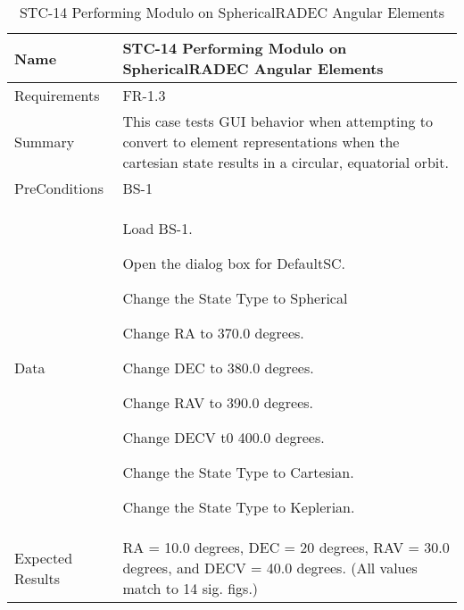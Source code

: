 
\begin{table}[htbp!]
\centering
      \begin{tabular}{|p{1.05 in} |p{4.75 in} |}
      \hline
         \rowcolor[rgb]{0.8,0.8,0.8} Name & STC-14 Performing Modulo on SphericalRADEC Angular Elements\\
         \hline
         Requirements & FR-1.3\\  \hline
         Summary &
         This  case tests GUI behavior when attempting to convert to element representations when the
         cartesian state results in a circular, equatorial orbit.
         \\     \hline
         PreConditions & BS-1\\     \hline
         Data &
         \begin{compactenum}
             \item Load BS-1.
             \item Open the dialog box for DefaultSC.
             \item Change the State Type to Spherical
             \item Change RA to 370.0 degrees.
             \item Change DEC to 380.0 degrees.
             \item Change RAV to 390.0 degrees.
             \item Change DECV t0 400.0 degrees.
             \item Change the State Type to Cartesian.
             \item Change the State Type to Keplerian.
         \end{compactenum}
         \\ \hline
         Expected Results & RA = 10.0 degrees, DEC = 20 degrees, RAV = 30.0 degrees, and DECV = 40.0 degrees. (All
         values match to 14 sig. figs.)\\
      \hline
      \end{tabular}
      \label{Table:STC-14}
      \caption{STC-14 Performing Modulo on SphericalRADEC Angular Elements}
\end{table} 